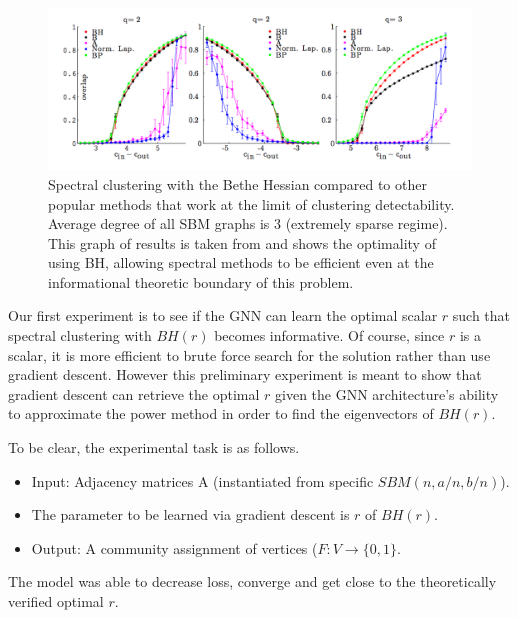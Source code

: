 \begin{figure}[h]
  \begin{center}
  \includegraphics[scale=0.4]{BH_SBM.png}
  \caption{Spectral clustering with the Bethe Hessian compared to other popular methods that work at the limit of clustering detectability. Average degree of all SBM graphs is 3 (extremely sparse regime). This graph of results is taken from \cite{AFL} and shows the optimality of using BH, allowing spectral methods to be efficient even at the informational theoretic boundary of this problem.}
  \end{center}
\end{figure}

Our first experiment is to see if the GNN can learn the optimal scalar $r$ such that spectral clustering with $BH(r)$ becomes informative. Of course, since $r$ is a scalar, it is more efficient to brute force search for the solution rather than use gradient descent. However this preliminary experiment is meant to show that gradient descent can retrieve the optimal $r$ given the GNN architecture's ability to approximate the power method in order to find the eigenvectors of $BH(r)$.  

To be clear, the experimental task is as follows.

\begin{itemize}
    \item Input: Adjacency matrices A (instantiated from specific $SBM(n,a/n, b/n)$). 
    \item The parameter to be learned via gradient descent is $r$ of $BH(r)$. 
    \item Output: A community assignment of vertices ($F : V \rightarrow \{0,1\}$. 
    
\end{itemize}

The model was able to decrease loss, converge and get close to the theoretically verified optimal $r$. 

